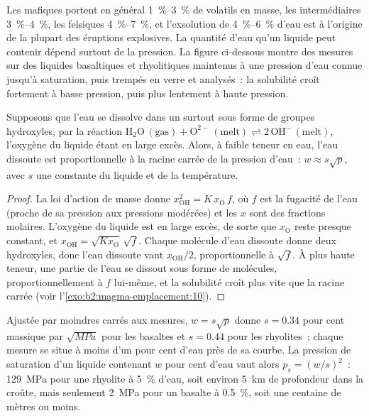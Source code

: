 Les  mafiques portent en général \qtyrange{1}{3}{\percent} de volatils en masse,
les  intermédiaires \qtyrange{3}{4}{\percent}, les  felsiques
\qtyrange{4}{7}{\percent}, et l'exsolution de \qtyrange{4}{6}{\percent} d'eau
est à l'origine de la plupart des éruptions explosives. La quantité d'eau qu'un liquide peut
contenir dépend surtout de la pression. La figure ci-dessous montre des mesures sur des liquides
basaltiques et rhyolitiques maintenus à une pression d'eau connue jusqu'à saturation, puis trempés
en verre et analysés~: la solubilité croît fortement à basse pression, puis plus lentement
à haute pression.

\begin{proposition}\label{prop:b2:magma-emplacement:sqrt}
Supposons que l'eau se dissolve dans un  surtout sous forme de groupes hydroxyles, par
la réaction $\mathrm{H_2O\,(gas)} + \mathrm{O^{2-}\,(melt)} \rightleftharpoons
2\,\mathrm{OH^-\,(melt)}$, l'oxygène du liquide étant en large excès. Alors, à
faible teneur en eau, l'eau dissoute est proportionnelle à la racine carrée de
la pression d'eau~: $w \approx s\sqrt{p}$, avec $s$ une constante du liquide et de la
température.
\end{proposition}

\begin{proof}
La loi d'action de masse donne $x_{\mathrm{OH}}^2 = K\,x_{\mathrm{O}}\,f$, où $f$ est
la fugacité de l'eau (proche de sa pression aux pressions modérées) et les $x$
sont des fractions molaires. L'oxygène du liquide est en large excès, de sorte que
$x_{\mathrm{O}}$ reste presque constant, et $x_{\mathrm{OH}} = \sqrt{Kx_{\mathrm{O}}}\,
\sqrt f$. Chaque molécule d'eau dissoute donne deux hydroxyles, donc l'eau dissoute
vaut $x_{\mathrm{OH}}/2$, proportionnelle à $\sqrt f$. À plus haute teneur, une partie
de l'eau se dissout sous forme de molécules, proportionnellement à $f$ lui-même, et la
solubilité croît plus vite que la racine carrée (voir l'\cref{exo:b2:magma-emplacement:10}).
\end{proof}

Ajustée par moindres carrés aux mesures, $w = s\sqrt p$ donne
$s = 0.34$ pour cent massique par $\sqrt{\unit{MPa}}$ pour les basaltes et
$s = 0.44$ pour les rhyolites~; chaque mesure se situe à moins d'un pour cent d'eau
près de sa courbe. La pression de saturation d'un liquide contenant $w$ pour cent
d'eau vaut alors $p_s = (w/s)^2$~: \qty{129}{MPa} pour une rhyolite à
\qty{5}{\percent} d'eau, soit environ \qty{5}{km} de profondeur dans la croûte, mais seulement
\qty{2}{MPa} pour un basalte à \qty{0.5}{\percent}, soit une centaine de mètres ou moins.

